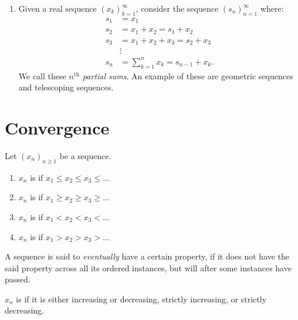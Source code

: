 \begin{example}
\begin{enumerate}[label = (\arabic*)]
            \item Given a real sequence $(x_k)_{k=1}^\infty$, consider the sequence $(s_n)_{n=1}^\infty$ where:
                \begin{equation*}
                \begin{split}
                    s_1 &= x_1 \\
                    s_2 &= x_1 + x_2 = s_1 + x_2 \\
                    s_3 &= x_1 + x_2 + x_3 = s_2 + x_3 \\
                    &\vdots \\
                    s_n &= \sum_{k = 1}^n x_k = s_{n-1} + x_k.
                \end{split}
                \end{equation*}
            We call these \textit{$n^{\text{th}}$ partial sums}. An example of these are geometric sequences and telescoping sequences.
        \end{enumerate}
    \end{example}

\section{Convergence}
    \begin{definition}
        Let $(x_n)_{n\geq 1}$ be a sequence.
        \begin{enumerate}[label = (\arabic*)]
            \item $x_n$ is  if $x_1 \leq x_2 \leq x_3 \leq ...$
            \item $x_n$ is  if $x_1 \geq x_2 \geq x_3 \geq ...$
            \item $x_n$ is  if $x_1 < x_2 < x_3 < ...$
            \item $x_n$ is  if $x_1 > x_2 > x_3 > ...$
        \end{enumerate}
    \end{definition}

    \begin{note}
        A sequence is said to \textit{eventually} have a certain property, if it does not have the said property across all its ordered instances, but will after some instances have passed.
    \end{note}

    \begin{note}
        $x_n$ is  if it is either increasing or decreasing, strictly increasing, or strictly decreasing.
    \end{note}

